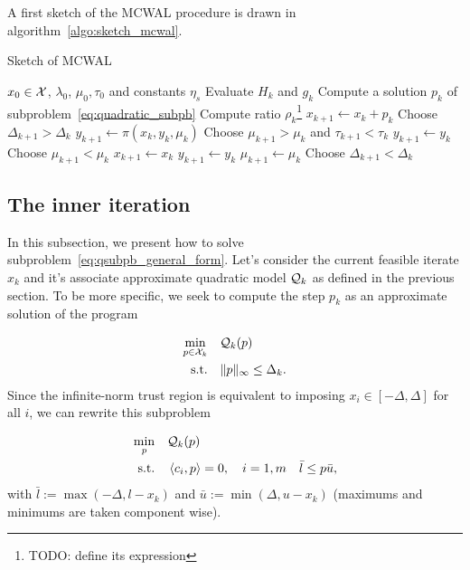 \documentclass[10pt]{article}
\numberwithin{equation}{section}
\begin{document}
	A first sketch of the MCWAL procedure is drawn in algorithm~\ref{algo:sketch_mcwal}.
	 \begin{algorithm}
	 	\caption{Sketch of MCWAL}\label{algo:sketch_mcwal}
	 	\begin{algorithmic}
	 		\Require $x_0\in {\mathcal{X}}$, $\lambda_0$, $\mu_0, \tau_0$ and constants $\eta_s$
	 		\State Evaluate $H_k$ and $g_k$ 
	 		\State Compute a solution $p_k$ of subproblem~\eqref{eq:quadratic_subpb} 
	 		\State Compute ratio $\rho_k$\footnote{TODO: define its expression}
	 		 
	 		\State $x_{k+1} \gets x_k+p_k$
	 		\State Choose $\Delta_{k+1} > \Delta_k$
	 		\State $y_{k+1} \gets \pi(x_k,y_k,\mu_k)$
	 		\State Choose $\mu_{k+1} > \mu_k$ and $\tau_{k+1} < \tau_k$
	 		\Else
	 		\State $y_{k+1} \gets y_k$
	 		\State Choose $\mu_{k+1} < \mu_k$
	 		\EndIf
	 		\Else {}
	 		\State  $x_{k+1} \gets x_k$
	 		\State  $y_{k+1} \gets y_k$
	 		\State  $\mu_{k+1} \gets \mu_k$
	 		\State Choose $\Delta_{k+1} < \Delta_k$
	 		\EndIf
	 		\EndWhile
	 	\end{algorithmic}
	 \end{algorithm}
	 
	 \subsection{The inner iteration}
	 
	 In this subsection, we present how to solve subproblem~\eqref{eq:qsubpb_general_form}. Let's consider the current feasible iterate $x_k$ and it's associate approximate quadratic model ${\mathcal{Q}}_k$ as defined in the previous section. To be more specific, we seek to compute the step $p_k$ as an approximate solution of the program
	 
	 \begin{equation*}
	 	\begin{aligned}
	 		\min_{p\in {\mathcal{X}}_k} \quad& {\mathcal{Q}}_k(p)  \\
	 		\text{s.t.}  \quad &  \|p\|_\infty \le \Delta_k.
	 	\end{aligned}	
	 \end{equation*}
	 Since the infinite-norm trust region is equivalent to imposing $x_i \in [-\Delta,\Delta]$ for all $i$, we can rewrite this subproblem

	\begin{equation}\label{eq:qsubpb} 
		\begin{aligned}
			\min_{p} \quad& {\mathcal{Q}}_k(p)  \\
			\text{s.t.}  \quad &  \left\langle {c_i} , {p} \right\rangle = 0,\quad i=1,m
			& \bar{l} \le p \bar{u},
		\end{aligned}	
	\end{equation}
	with $\bar{l}:= \max(-\Delta,l-x_k)$ and $\bar{u}:= \min(\Delta,u-x_k)$ (maximums and minimums are taken component wise).
	
\end{document}
